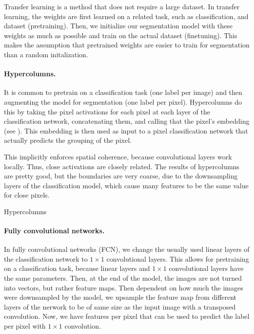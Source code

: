 Transfer learning is a method that does not require a large
dataset. In transfer learning, the weights are first learned on a
related task, such as classification, and dataset (pretraining). Then, we
initialize our segmentation model with these weights as much as possible and
train on the actual dataset (finetuning). This makes the assumption that
pretrained weights are easier to train for segmentation than a random
initalization.

\paragraph{Hypercolumns.}

It is common to pretrain on a classification task (one label per image) and
then augmenting the model for segmentation (one label per pixel). Hypercolumns
do this by taking the pixel activations for each pixel at each layer of the
classification network, concatenating them, and calling that the pixel's
embedding (see ). This
embedding is then used as input to a pixel classification network that actually
predicts the grouping of the pixel.

This implicitly enforces spatial coherence, because convolutional layers work
locally. Thus, close activations are closely related. The results of
hypercolumns are pretty good, but the boundaries are very coarse, due to the
downsampling layers of the classification model, which cause many features to
be the same value for close pixels.

\begin{marginfigure}
    \centering
    \caption{Hypercolumns}
    \label{fig:hypercolumns}
\end{marginfigure}

\paragraph{Fully convolutional networks.}

In fully convolutional networks (FCN), we change the usually used linear layers
of the classification network to $1\times 1$ convolutional layers. This allows
for pretraining on a classification task, because linear layers and $1\times 1$
convolutional layers have the same parameters. Then, at the end of the model,
the images are not turned into vectors, but rather feature maps. Then dependent
on how much the images were downsampled by the model, we upsample the feature
map from different layers of the nerwork to be of same size as the input image
with a transposed convolution. Now, we have features per pixel that can be used
to predict the label per pixel with $1\times 1$ convolution.

